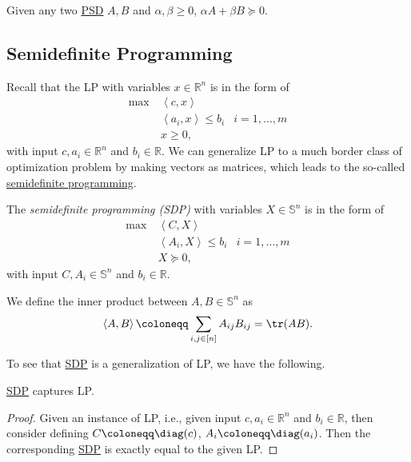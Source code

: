 \begin{remark}
	Given any two \hyperref[def:PSD]{PSD} \(A, B\) and \(\alpha , \beta \geq 0\), \(\alpha A + \beta B \succeq 0\).
\end{remark}

\subsection{Semidefinite Programming}
Recall that the LP with variables \(x\in \mathbb{R} ^n\) is in the form of
\[
	\begin{aligned}
		\max~ & \left\langle c, x \right\rangle                             \\
		      & \left\langle a_i, x \right\rangle \leq b_i & i=1, \dots , m \\
		      & x \geq 0,
	\end{aligned}
\]
with input \(c, a_i\in \mathbb{R} ^n\) and \(b_i\in \mathbb{R} \). We can generalize LP to a much border class of optimization problem by making vectors as matrices, which leads to the so-called \hyperref[def:SDP]{semidefinite programming}.

\begin{definition}\label{def:SDP}
	The \emph{semidefinite programming (SDP)} with variables \(X\in \mathbb{S} ^n\) is in the form of
	\[
		\begin{aligned}
			\max~ & \left\langle C, X \right\rangle                             \\
			      & \left\langle A_i, X \right\rangle \leq b_i & i=1, \dots , m \\
			      & X \succeq 0,
		\end{aligned}
	\]
	with input \(C, A_i\in \mathbb{S} ^n\) and \(b_i\in \mathbb{R} \).
\end{definition}

\begin{remark}
	We define the inner product between \(A, B\in \mathbb{S} ^n\) as
	\[
		\left\langle A, B \right\rangle \coloneqq \sum_{i, j\in [n]} A_{ij} B_{ij} = \tr(AB).
	\]
\end{remark}

To see that \hyperref[def:SDP]{SDP} is a generalization of LP, we have the following.

\begin{lemma}
	\hyperref[def:SDP]{SDP} captures LP.
\end{lemma}
\begin{proof}
	Given an instance of LP, i.e., given input \(c, a_i\in \mathbb{R} ^n\) and \(b_i\in \mathbb{R} \), then consider defining \(C\coloneqq \diag(c)\), \(A_i \coloneqq \diag(a_i)\). Then the corresponding \hyperref[def:SDP]{SDP} is exactly equal to the given LP.
\end{proof}

